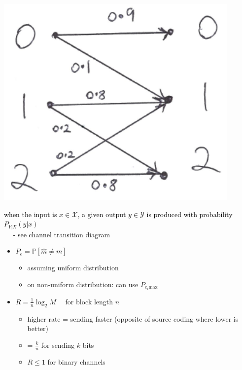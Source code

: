 \documentclass[10pt, landscape]{article}
\begin{document}
\begin{multicols*}{4}
  \begin{minipage}[c]{0.3\linewidth}
    \includegraphics[width=0.95\linewidth]{cs3236-channel-transition-diagram-2.png} 
  \end{minipage}
  \begin{minipage}[c]{0.65\linewidth}{\textcolor{black}{
         when the input is $x \in \mathcal{X}$, a given output $y \in  \mathcal{Y}$ is produced with probability $P_{Y \vert X} (y \vert x)$ 
        \\$\quad$ - see channel transition diagram
    }}
  \end{minipage}

  \begin{itemize}
    \item {} $P_e = \mathbb{P}[\hat{m} \neq m]$
      \begin{itemize}
        \item assuming uniform distribution
        \item on non-uniform distribution: can use  $P_{e_i \text{max}}$
      \end{itemize}
    \item {} $R = \frac{1}{n} \log_2 M \quad$ for block length $n$
      \begin{itemize}
        \item higher rate = sending faster (opposite of source coding where lower is better)
        \item = $\frac{k}{n}$ for sending $k$ bits
        \item $R \leq 1$ for binary channels
      \end{itemize}
  \end{itemize}


\end{multicols*}
\end{document}
